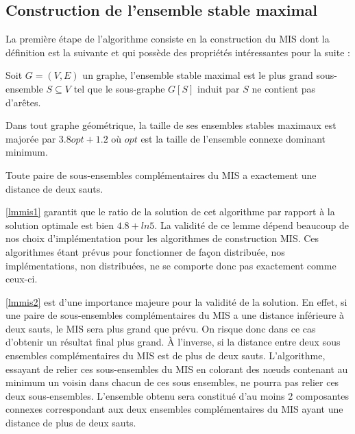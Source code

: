 \subsection{Construction de l'ensemble stable maximal}\label{mis}
La première étape de l'algorithme consiste en la construction du MIS dont la définition est la suivante et qui possède des propriétés intéressantes pour la suite :
\begin{defn}Soit $G=(V,E)$ un graphe, l'ensemble stable maximal est le plus grand sous-ensemble $S\subseteq V$ tel que le sous-graphe $G[S]$ induit par $S$ ne contient pas d'arêtes.\end{defn}

\begin{lemma}\label{lmmis1}
Dans tout graphe géométrique, la taille de ses ensembles stables maximaux est majorée par $3.8opt+1.2$ où $opt$ est la taille de l'ensemble connexe dominant minimum.
\end{lemma}

\begin{lemma}\label{lmmis2}
Toute paire de sous-ensembles complémentaires du MIS a exactement une distance de deux sauts.
\end{lemma}

\cref{lmmis1} garantit que le ratio de la solution de cet algorithme par rapport à la solution optimale est bien $4.8 + ln5$. La validité de ce lemme dépend beaucoup de nos choix d'implémentation pour les algorithmes de construction MIS. Ces algorithmes étant prévus pour fonctionner de façon distribuée, nos implémentations, non distribuées, ne se comporte donc pas exactement comme ceux-ci.

\cref{lmmis2} est d'une importance majeure pour la validité de la solution. En effet, si une paire de sous-ensembles complémentaires du MIS a une distance inférieure à deux sauts, le MIS sera plus grand que prévu. On risque donc dans ce cas d'obtenir un résultat final plus grand.
À l'inverse, si la distance entre deux sous ensembles complémentaires du MIS est de plus de deux sauts. L'algorithme, essayant de relier ces sous-ensembles du MIS en colorant des nœuds contenant au minimum un voisin dans chacun de ces sous ensembles, ne pourra pas relier ces deux sous-ensembles. L'ensemble obtenu sera constitué d'au moins 2 composantes connexes correspondant aux deux ensembles complémentaires du MIS ayant une distance de plus de deux sauts.

